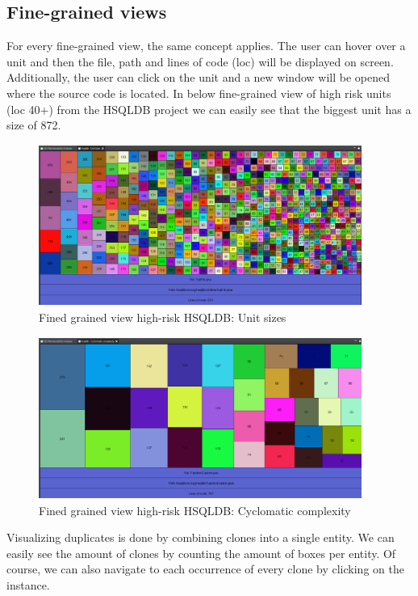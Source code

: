 \documentclass{article}
\begin{document}
\subsection{Fine-grained views}
For every fine-grained view, the same concept applies. 
The user can hover over a unit and then the file, path and lines of code (loc) will be displayed on screen. 
Additionally, the user can click on the unit and a new window will be opened where the source code is located.
In below fine-grained view of high risk units (loc 40+) from the HSQLDB project we can easily see that the biggest unit has a size of 872. 

\begin{figure}[!htbp]
	\centering
	\label{fig:unit-sizes}
	\caption{Fined grained view high-risk HSQLDB: Unit sizes}
	\includegraphics[width=400px, height=200px]{hsqldb_unitsizes.png}
\end{figure}

\begin{figure}[!htbp]
	\centering
	\label{fig:cyclomatic-complexity}
	\caption{Fined grained view high-risk HSQLDB: Cyclomatic complexity}
	\includegraphics[width=400px, height=200px]{hsqldb_coc.png}
\end{figure}

\clearpage 

Visualizing duplicates is done by combining clones into a single entity. 
We can easily see the amount of clones by counting the amount of boxes per entity.
Of course, we can also navigate to each occurrence of every clone by clicking on the instance.
\end{document}
